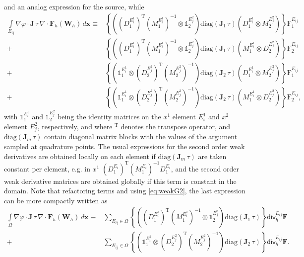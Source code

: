 \documentclass[a4paper,10pt]{article}
\newcommand{\id}{\mathds{1}}
\begin{document}
and  an analog expression for the source, while
\begin{equation}\label{eq:su_local_2a}
\begin{aligned}
\int\limits_{E_{ij}} \nabla \varphi\cdot \mathbf{J} \,\tau\, \nabla\cdot  \mathbf{F}_h(\mathbf{W}_h)\,d\mathbf{x}\equiv  & 
\left\{ \left( (D_1^{E_i^{1}})^{\mathrm{T}}  (M_1^{E_i^{1}})^{-1} \otimes \id_2^{E_j^{2}} \right)   \textrm{diag}(\mathbf{J}_1 \,\tau)  \left(D_1^{E_i^{1}}  \otimes M_2^{E_j^{2}} \right)  \right\} \mathrm{F}_1^{E_{ij}}\\[-7pt]
 + & \left\{ \left((D_1^{E_i^{1}})^{\mathrm{T}}(M_1^{E_i^{1}})^{-1}\otimes \id_2^{E_j^{2}} \right)     \textrm{diag}(\mathbf{J}_1 \,\tau)   \left(M_1^{E_i^{1}} \otimes D_2^{E_j^{2}}\right)  \right\} \mathrm{F}_2^{E_{ij}} \\
 + & \left\{  \left(\id_1^{E_i^{1}}    \otimes (D_2^{E_j^{2}})^{\mathrm{T}}(M_2^{E_j^{2}})^{-1}  \right)   \textrm{diag}(\mathbf{J}_2 \,\tau) \left( D_1^{E_i^{1}} \otimes M_2^{E_j^{2}}\right)  \right\} \mathrm{F}_1^{E_{ij}}\\[2pt]
  + &  \left\{ \left(\id_1^{E_i^{1}}   \otimes (D_2^{E_j^{2}})^{\mathrm{T}}(M_2^{E_j^{2}})^{-1} \right)   \textrm{diag}(\mathbf{J}_2 \,\tau) \left(M_1^{E_i^{1}}\otimes D_2^{E_j^{2}}\right)    \right\} \mathrm{F}_2^{E_{ij}},
 \end{aligned}
\end{equation}
with $\id_1^{E^1_i}$ and $\id_2^{E^2_j}$ being the identity matrices on the $x^1$ element $E_i^{1}$ and $x^2$ element $E_j^{2}$, respectively, and where $^{\mathrm{T}}$ denotes the transpose operator, and $\textrm{diag}(\mathbf{J}_m \,\tau)$ contain diagonal matrix blocks with  the values of the argument sampled at
quadrature points. 
The usual expressions  for the second order weak derivatives are obtained locally on each element 
if   $\textrm{diag}(\mathbf{J}_m \,\tau)$ are taken constant per element, e.g. in $x^1$ $(D_1^{E_i})^{\mathrm{T}} (M_1^{E_i})^{-1} D_1^{E_i}$, and the second order weak derivative matrices are obtained globally
if this term is  constant in the domain. Note that refactoring terms and using \eqref{eq:weakG2}, the last expression can be more compactly written as 
\begin{equation}\label{eq:su_local_2}
	\begin{split}
		\int\limits_{\Omega} \nabla \varphi\cdot \mathbf{J} \,\tau\, \nabla\cdot  \mathbf{F}_h(\mathbf{W}_h)\,d\mathbf{x}\equiv  &
		\sum_{E_{ij}\in\Omega}\left\{ \left( (D_1^{E_i^{1}})^{\mathrm{T}}  (M_1^{E_i^{1}})^{-1} \otimes \id_2^{E_j^{2}} \right)   \textrm{diag}(\mathbf{J}_1 \,\tau)  \right\}\textsf{div}_h^{E_{ij}}\mathbf{F}
		\\+ &\sum_{E_{ij}\in\Omega}\left\{ \left(\id_1^{E_i^{1}}   \otimes (D_2^{E_j^{2}})^{\mathrm{T}}(M_2^{E_j^{2}})^{-1} \right)   \textrm{diag}(\mathbf{J}_2 \,\tau)  \right\} \textsf{div}_h^{E_{ij}}\mathbf{F}.
	\end{split}
\end{equation}
\end{document}
